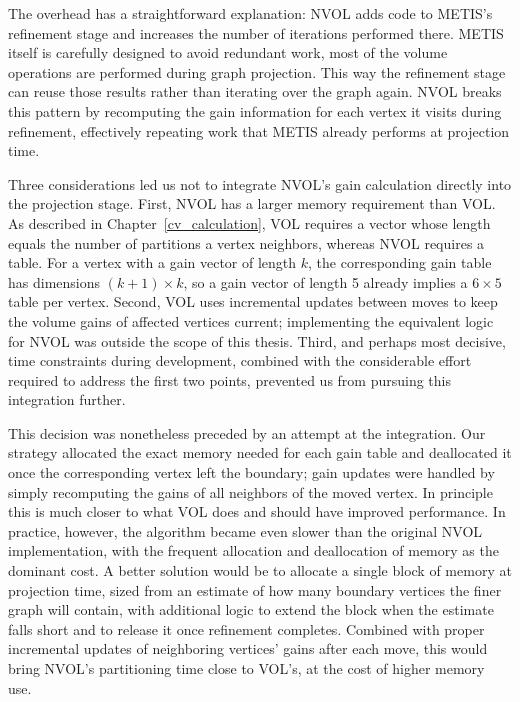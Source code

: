 The overhead has a straightforward explanation: NVOL adds code to METIS's refinement stage and increases the number of iterations performed there. METIS itself is carefully designed to avoid redundant work, most of the volume operations are performed during graph projection. This way the refinement stage can reuse those results rather than iterating over the graph again. NVOL breaks this pattern by recomputing the gain information for each vertex it visits during refinement, effectively repeating work that METIS already performs at projection time.

Three considerations led us not to integrate NVOL's gain calculation directly into the projection stage. First, NVOL has a larger memory requirement than VOL. As described in Chapter~\ref{cv_calculation}, VOL requires a vector whose length equals the number of partitions a vertex neighbors, whereas NVOL requires a table. For a vertex with a gain vector of length $k$, the corresponding gain table has dimensions $(k+1)\times k$, so a gain vector of length 5 already implies a $6 \times 5$ table per vertex. Second, VOL uses incremental updates between moves to keep the volume gains of affected vertices current; implementing the equivalent logic for NVOL was outside the scope of this thesis. Third, and perhaps most decisive, time constraints during development, combined with the considerable effort required to address the first two points, prevented us from pursuing this integration further. 

This decision was nonetheless preceded by an attempt at the integration. Our strategy allocated the exact memory needed for each gain table and deallocated it once the corresponding vertex left the boundary; gain updates were handled by simply recomputing the gains of all neighbors of the moved vertex. In principle this is much closer to what VOL does and should have improved performance. In practice, however, the algorithm became even slower than the original NVOL implementation, with the frequent allocation and deallocation of memory as the dominant cost. A better solution would be to allocate a single block of memory at projection time, sized from an estimate of how many boundary vertices the finer graph will contain, with additional logic to extend the block when the estimate falls short and to release it once refinement completes. Combined with proper incremental updates of neighboring vertices' gains after each move, this would bring NVOL's partitioning time close to VOL's, at the cost of higher memory use.

